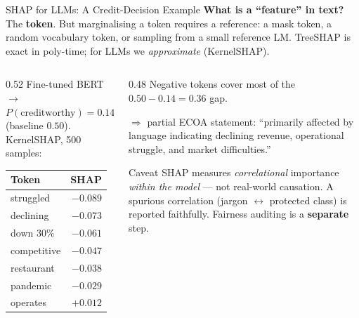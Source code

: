 \documentclass[9pt,t]{beamer}
\begin{document}
\begin{frame}{SHAP for LLMs: A Credit-Decision Example}
\textbf{What is a ``feature'' in text?} The \textbf{token}. But marginalising a
token requires a reference: a mask token, a random vocabulary token, or sampling
from a small reference LM. TreeSHAP is exact in poly-time; for LLMs we
\emph{approximate} (KernelSHAP).

\medskip
\begin{columns}[T]
\begin{column}{0.52\textwidth}
\footnotesize
Fine-tuned BERT $\to$ $P(\text{creditworthy})=0.14$ (baseline $0.50$).
KernelSHAP, 500 samples:
\begin{tabular}{lr}
\toprule
Token & SHAP \\
\midrule
struggled   & $-0.089$ \\
declining   & $-0.073$ \\
down 30\%   & $-0.061$ \\
competitive & $-0.047$ \\
restaurant  & $-0.038$ \\
pandemic    & $-0.029$ \\
operates    & $+0.012$ \\
\bottomrule
\end{tabular}
\end{column}
\begin{column}{0.48\textwidth}
\footnotesize
Negative tokens cover most of the $0.50 - 0.14 = 0.36$ gap.

\medskip
$\Rightarrow$ partial ECOA statement: ``primarily affected by language indicating
declining revenue, operational struggle, and market difficulties.''

\medskip
\begin{alertblock}{Caveat}
SHAP measures \emph{correlational} importance \emph{within the model} --- not
real-world causation. A spurious correlation (jargon $\leftrightarrow$
protected class) is reported faithfully. Fairness auditing is a
\textbf{separate} step.
\end{alertblock}
\end{column}
\end{columns}
\end{frame}
\end{document}
